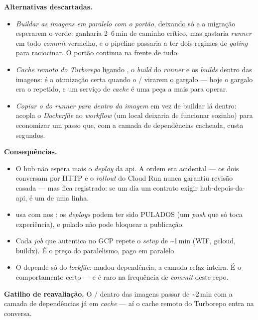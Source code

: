 \textbf{Alternativas descartadas.}
\begin{itemize}
  \item \emph{Buildar as imagens em paralelo com o portão}, deixando só
     e a migração esperarem o verde: ganharia 2--6\,min de
    caminho crítico, mas gastaria \emph{runner} em todo \emph{commit} vermelho, e
    o pipeline passaria a ter dois regimes de \emph{gating} para raciocinar. O
    portão continua na frente de tudo.
  \item \emph{Cache remoto do Turborepo} ligando , o \emph{build}
    do \emph{runner} e os \emph{builds} dentro das imagens: é a otimização certa
    quando o / virarem o gargalo --- hoje o gargalo era o
     repetido, e um serviço de \emph{cache} é uma peça a mais
    para operar.
  \item \emph{Copiar o  do runner para dentro da imagem} em vez de
    buildar lá dentro: acopla o \emph{Dockerfile} ao \emph{workflow} (um
     local deixaria de funcionar sozinho) para economizar um
    passo que, com a camada de dependências cacheada, custa segundos.
\end{itemize}

\textbf{Consequências.}
\begin{itemize}
  \item O hub não espera mais o \emph{deploy} da api. A ordem era acidental ---
    os dois conversam por HTTP e o \emph{rollout} do Cloud Run nunca garantiu
    revisão casada --- mas fica registrado: se um dia um contrato exigir
    hub-depois-da-api, é um  de uma linha.
  \item {} usa  com 
    nos : os \emph{deploys} podem ter sido PULADOS (um \emph{push} que
    só toca experiência), e pulado não pode bloquear a publicação.
  \item Cada \emph{job} que autentica no GCP repete o \emph{setup} de
    \textasciitilde 1\,min (WIF, gcloud, buildx). É o preço do paralelismo, pago
    em paralelo.
  \item O  depende só do \emph{lockfile}: mudou dependência, a
    camada refaz inteira. É o comportamento certo --- e é raro na frequência de
    \emph{commit} deste repo.
\end{itemize}

\textbf{Gatilho de reavaliação.} O / dentro das
imagens passar de \textasciitilde 2\,min com a camada de dependências já em
\emph{cache} --- aí o cache remoto do Turborepo entra na conversa.

